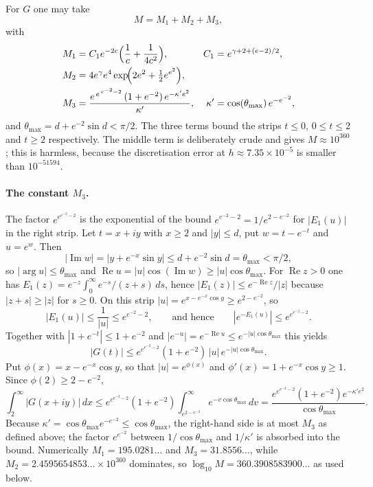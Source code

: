 \documentclass[11pt,a4paper]{article}
\theoremstyle{remark}
\begin{document}
For $G$ one may take
\begin{equation}
  M=M_1+M_2+M_3,
  \label{eq:M}
\end{equation}
with
\begin{align}
  M_1&=C_1e^{-2c}\Bigl(\frac1c+\frac1{4c^2}\Bigr),
  &C_1&=e^{\gamma+2+(e-2)/2},\\
  M_2&=4e^{\gamma}e^{4}\exp\!\Bigl(2e^2+\tfrac12e^{e^2}\Bigr),\\
  M_3&=\frac{e^{\,e^{\,e^{-2}-2}}\,(1+e^{-2})\,e^{-\kappa'e^2}}{\kappa'},
  &\kappa'&=\cos(\theta_{\max})\,e^{-e^{-2}},
\end{align}
and $\theta_{\max}=d+e^{-2}\sin d<\pi/2$. The three terms bound the
strips $t\le0$, $0\le t\le2$ and $t\ge2$ respectively. The middle term
is deliberately crude and gives $M\approx10^{360}$; this is harmless,
because the discretisation error at $h\approx7.35\times10^{-5}$ is
smaller than $10^{-51594}$.

\paragraph{The constant $M_3$.}
The factor $e^{e^{e^{-2}-2}}$ is the exponential of the bound
$e^{e^{-2}-2}=1/e^{2-e^{-2}}$ for $|E_1(u)|$ in the right strip.
Let $t=x+iy$ with $x\ge2$ and $|y|\le d$, put $w=t-e^{-t}$ and
$u=e^{w}$. Then
\[
  |\operatorname{Im}w|=|y+e^{-x}\sin y|
  \le d+e^{-2}\sin d=\theta_{\max}<\pi/2,
\]
so $|\arg u|\le\theta_{\max}$ and
$\operatorname{Re}u=|u|\cos(\operatorname{Im}w)\ge|u|\cos\theta_{\max}$.
For $\operatorname{Re}z>0$ one has
$E_1(z)=e^{-z}\int_0^\infty e^{-s}/(z+s)\,ds$, hence
$|E_1(z)|\le e^{-\operatorname{Re}z}/|z|$ because
$|z+s|\ge|z|$ for $s\ge0$. On this strip
$|u|=e^{x-e^{-x}\cos y}\ge e^{2-e^{-2}}$, so
\[
  |E_1(u)|\le\frac{1}{|u|}\le e^{e^{-2}-2},
  \qquad\text{and hence}\qquad
  |e^{-E_1(u)}|\le e^{e^{e^{-2}-2}} .
\]
Together with $|1+e^{-t}|\le1+e^{-2}$ and
$|e^{-u}|=e^{-\operatorname{Re}u}\le e^{-|u|\cos\theta_{\max}}$ this
yields
\[
  |G(t)|\le e^{e^{e^{-2}-2}}(1+e^{-2})\,|u|\,
  e^{-|u|\cos\theta_{\max}} .
\]
Put $\phi(x)=x-e^{-x}\cos y$, so that $|u|=e^{\phi(x)}$ and
$\phi'(x)=1+e^{-x}\cos y\ge1$. Since $\phi(2)\ge2-e^{-2}$,
\[
  \int_2^\infty|G(x+iy)|\,dx
  \le e^{e^{e^{-2}-2}}(1+e^{-2})
  \int_{e^{2-e^{-2}}}^\infty e^{-v\cos\theta_{\max}}\,dv
  =\frac{e^{e^{e^{-2}-2}}(1+e^{-2})e^{-\kappa'e^2}}
        {\cos\theta_{\max}} .
\]
Because $\kappa'=\cos\theta_{\max}e^{-e^{-2}}\le\cos\theta_{\max}$,
the right-hand side is at most $M_3$ as defined above; the factor
$e^{e^{-2}}$ between $1/\cos\theta_{\max}$ and $1/\kappa'$ is absorbed
into the bound. Numerically $M_1=195.0281\ldots$ and
$M_3=31.8556\ldots$, while $M_2=2.4595654853\ldots\times10^{360}$
dominates, so $\log_{10}M=360.3908583900\ldots$ as used below.
\end{document}
